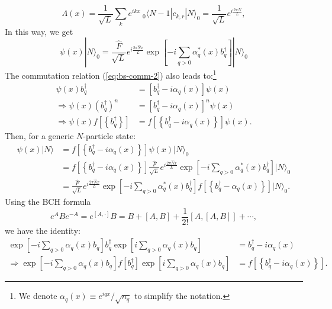 \begin{equation}
	\Lambda(x) = \frac{1}{\sqrt L}\sum_k e^{ikx}\ {}_{0}\langle N-1| c_{k,r}|N\rangle_0 
	= \frac{1}{\sqrt L} e^{i\frac{2\pi N}{L}},
\end{equation}
In this way, we get
\begin{equation}
	\psi(x)|N\rangle_{0} = \frac{\hat F}{\sqrt{L}} e^{i \frac{2 \pi \hat{N} x}{L}} \exp \left[-i\sum_{q>0} \alpha^*_q(x) b_{q}^{\dagger}\right]|N\rangle_{0}
\end{equation}
The commutation relation (\ref{eq:bs-comm-2}) also leads to:\footnote{We denote $\alpha_q(x) \equiv e^{iqx}/\sqrt{n_q}$ to simplify the notation.}
\begin{equation*}
\begin{aligned}
	\psi(x) b_{q}^{\dagger} 
	&=\left[b_{q}^{\dagger}-i\alpha_{q}(x)\right] \psi(x) \\
	\Rightarrow \psi(x)\left(b_{q}^{\dagger}\right)^{n} 
	&=\left[b_{q}^{\dagger}-i\alpha_{q}(x)\right]^{n} \psi(x) \\
	\Rightarrow \psi(x) f\left[\left\{b_{q}^{\dagger}\right\}\right] 
	&=f\left[\left\{b_{q}^{\dagger}-i\alpha_{q}(x)\right\}\right] \psi(x).
\end{aligned}
\end{equation*}
Then, for a generic $N$-particle state:
\begin{equation}\label{eq:bs-temp1}
\begin{aligned}
	\psi(x)|N\rangle 
	&=f\left[\left\{b_{q}^{\dagger}-i\alpha_{q}(x)\right\}\right] \psi(x)|N\rangle_{0} \\
	&=f\left[\left\{b_{q}^{\dagger}-i\alpha_{q}(x)\right\}\right] \frac{\hat{F}}{\sqrt{L}} e^{i \frac{2 \pi \hat{N} x}{L}} \exp \left[-i\sum_{q>0} \alpha^*_{q}(x) b_{q}^{\dagger}\right]|N\rangle_{0} \\
	&=\frac{\hat{F}}{\sqrt{L}} e^{i \frac{2 \pi \hat{N} x}{L}} \exp \left[-i\sum_{q>0} \alpha^*_{q}(x) b_{q}^{\dagger}\right] f\left[\left\{b_{q}^{\dagger}-\alpha_{q}(x)\right\}\right]|N\rangle_{0}.
\end{aligned}
\end{equation}
Using the BCH formula
\begin{equation}
	e^A B e^{-A} = e^{[A,\cdot]} B = B + [A,B] + \frac{1}{2!}[A,[A,B]]+\cdots,
\end{equation}
we have the identity:
\begin{equation*}
\begin{aligned}
	\exp \left[-i\sum_{q>0} \alpha_{q}(x) b_{q}\right] b_{q}^{\dagger} \exp \left[i\sum_{q>0} \alpha_{q}(x) b_{q}\right] &=b_{q}^{\dagger}-i\alpha_{q}(x) \\
	\Rightarrow \exp \left[-i\sum_{q>0} \alpha_{q}(x) b_{q}\right] f\left[b_{q}^{\dagger}\right] \exp \left[i\sum_{q>0} \alpha_{q}(x) b_{q}\right] &=f\left[\left\{b_{q}^{\dagger}-i\alpha_{q}(x)\right\}\right].
\end{aligned}
\end{equation*}
